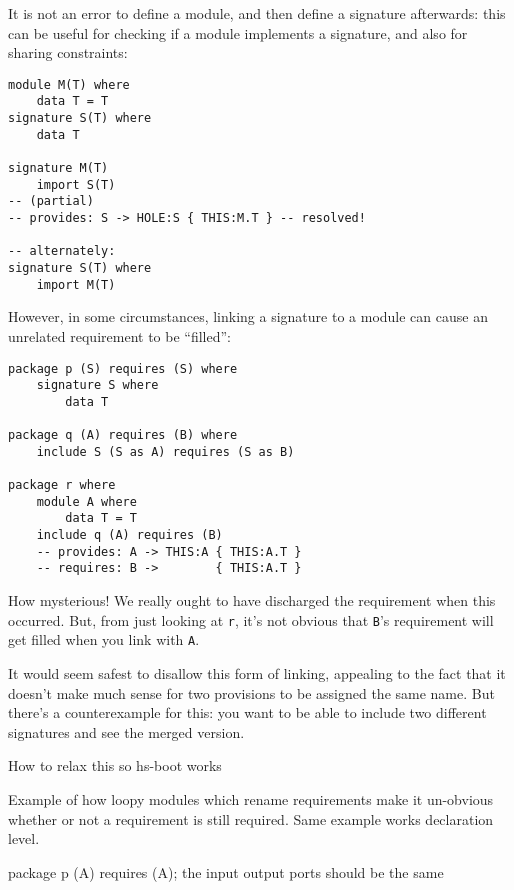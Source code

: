 \documentclass{article}
\newcommand{\Red}[1]{{\color{red} #1}}
\begin{document}
It is not an error to define a module, and then define a signature
afterwards: this can be useful for checking if a module implements
a signature, and also for sharing constraints:

\begin{verbatim}
module M(T) where
    data T = T
signature S(T) where
    data T

signature M(T)
    import S(T)
-- (partial)
-- provides: S -> HOLE:S { THIS:M.T } -- resolved!

-- alternately:
signature S(T) where
    import M(T)
\end{verbatim}

However, in some circumstances, linking a signature to a module can cause an
unrelated requirement to be ``filled'':

\begin{verbatim}
package p (S) requires (S) where
    signature S where
        data T

package q (A) requires (B) where
    include S (S as A) requires (S as B)

package r where
    module A where
        data T = T
    include q (A) requires (B)
    -- provides: A -> THIS:A { THIS:A.T }
    -- requires: B -> 		 { THIS:A.T }
\end{verbatim}

How mysterious! We really ought to have discharged the requirement when
this occurred. But, from just looking at \verb|r|, it's not obvious that
\verb|B|'s requirement will get filled when you link with \verb|A|.

It would seem safest to disallow this form of linking, appealing to the
fact that it doesn't make much sense for two provisions to be assigned
the same name. But there's a counterexample for this: you want to be able
to include two different signatures and see the merged version.

\Red{How to relax this so hs-boot works}

\Red{Example of how loopy modules which rename requirements make it un-obvious whether or not
a requirement is still required.  Same example works declaration level.}

\Red{package p (A) requires (A); the input output ports should be the same}

%
%
%
\end{document}
